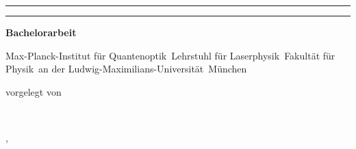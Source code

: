 \begin{titlepage}   

    {\parindent0cm
    \rule{\linewidth}{.4ex}}
  \begin{center}
    {\sffamily \bfseries \Huge \renewcommand{\baselinestretch}{1.18}\selectfont\parbox{0.95\linewidth}{\centering \getTitleDE}}
  \end{center}
    \rule{\linewidth}{.4ex}


  \begin{center}
    {\rmfamily \bfseries \Large Bachelorarbeit}


    {\large
     Max-Planck-Institut für Quantenoptik\
     Lehrstuhl für Laserphysik\
     Fakultät für Physik\
     an der Ludwig-Maximilians-Universität\
     München
     
     \vspace*{\stretch{1}}
     
     vorgelegt von \
    
     {\rmfamily \bfseries \Large \getAuthor} \

     
     \vspace*{\stretch{2}}
     \getPrintLocationDE, \getSubmissionDateDE
     }
  \end{center}
  
\end{titlepage}
